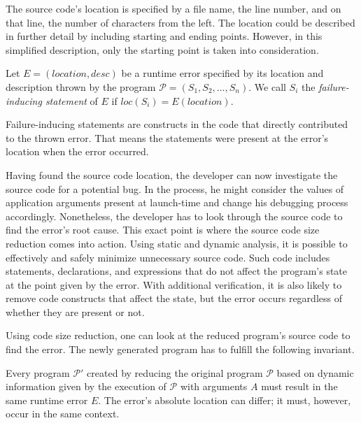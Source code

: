 The source code's location is specified by a file name, the line number, and 
on that line, the number of characters from the left.
The location could be described in further detail by including starting and 
ending points.
However, in this simplified description, only the starting point is taken 
into consideration.

\begin{defn}\label{def04:2}
  Let $E = (location, desc)$ be a runtime error specified by its location 
  and description thrown by the program $\mathcal{P} =
  (S_1, S_2, \ldots, S_n)$.
  We call $S_i$ the \emph{failure-inducing statement} of 
  $E$ if $loc(S_i) = E(location)$.
\end{defn}

Failure-inducing statements are constructs in the code that directly 
contributed to the thrown error.
That means the statements were present at the error's location when the error 
occurred.

Having found the source code location, the developer can now investigate 
the source code for a potential bug.
In the process, he might consider the values of application arguments 
present at launch-time and change his debugging process accordingly.
Nonetheless, the developer has to look through the source code to find 
the error's root cause.
This exact point is where the source code size reduction comes into action.
Using static and dynamic analysis, it is possible to effectively and 
safely minimize unnecessary source code.
Such code includes statements, declarations, and expressions that do not 
affect the program's state at the point given by the error.
With additional verification, it is also likely to remove code constructs 
that affect the state, but the error occurs regardless of whether they 
are present or not.

Using code size reduction, one can look at the reduced program's source 
code to find the error.
The newly generated program has to fulfill the following invariant.

\begin{invar}\label{invar04:1}
  Every program $\mathcal{P'}$ created by reducing the original program 
  $\mathcal{P}$ based on dynamic information given by the execution of
  $\mathcal{P}$ with arguments $A$ must result in the same runtime error $E$.
  The error's absolute location can differ; it must, however, occur in the 
  same context.
\end{invar}

